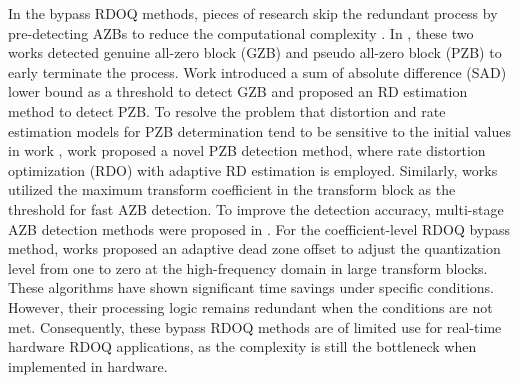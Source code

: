 \documentclass[lettersize,journal]{IEEEtran}
\begin{document}
In the bypass RDOQ methods, pieces of research skip the redundant process by pre-detecting AZBs to reduce the computational complexity \cite{lee2015fastquantizationmethod, zhang2015fastrdoq, lee2016all-zero, wang2017fastrdoq}. In \cite{fan2016hybridzreoblock, cui2018hybrid}, these two works detected genuine all-zero block (GZB) and pseudo all-zero block (PZB) to early terminate the process. Work \cite{fan2016hybridzreoblock} introduced a sum of absolute difference (SAD) lower bound as a threshold to detect GZB and proposed an RD estimation method to detect PZB. 
To resolve the problem that distortion and rate estimation models for PZB determination tend to be sensitive to the initial values in work \cite{fan2016hybridzreoblock}, work \cite{cui2018hybrid} proposed a novel PZB detection method, where rate distortion optimization (RDO) with adaptive RD estimation is employed. Similarly, works \cite{cui2017adaptive, wei2019all} utilized the maximum transform coefficient in the transform block as the threshold for fast AZB detection. To improve the detection accuracy, multi-stage AZB detection methods were proposed in \cite{yin2018efficient, yin2020multistageallzerodetection}. For the coefficient-level RDOQ bypass method, works \cite{xu2018simplifiedrdoq, xu2020simplifiedLevelEstimation} proposed an adaptive dead zone offset to adjust the quantization level from one to zero at the high-frequency domain in large transform blocks. 
These algorithms have shown significant time savings under specific conditions. However, their processing logic remains redundant when the conditions are not met. Consequently, these bypass RDOQ methods are of limited use for real-time hardware RDOQ applications, as the complexity is still the bottleneck when implemented in hardware. 


\end{document}
